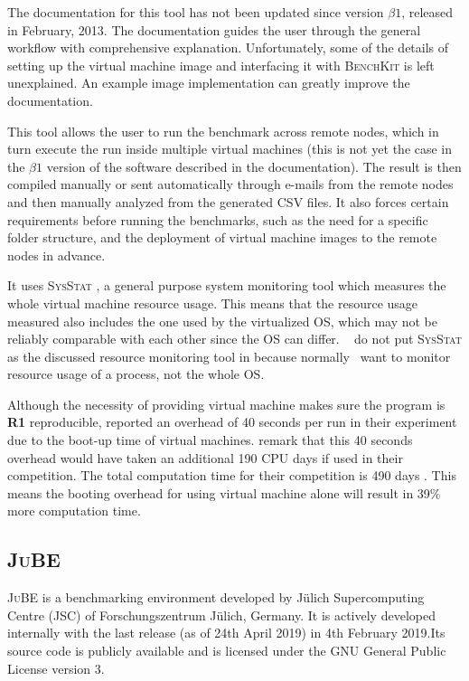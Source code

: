The documentation for this tool has not been updated since version $\beta1$, released in February, 2013.
The documentation guides the user through the general workflow with comprehensive explanation.
Unfortunately, some of the details of setting up the virtual machine image and interfacing it with \textsc{BenchKit} is left unexplained.
An example image implementation can greatly improve the documentation.


This tool allows the user to run the benchmark across remote nodes, which in turn execute the run inside multiple virtual machines (this is not yet the case in the $\beta1$ version of the software described in the documentation).
The result is then compiled manually or sent automatically through e-mails from the remote nodes and then manually analyzed from the generated CSV files.
It also forces certain requirements before running the benchmarks, such as the need for a specific folder structure, and the deployment of virtual machine images to the remote nodes in advance.

It uses \textsc{SysStat} \citep{sebastienPerformanceMonitoringTools2019}, a general purpose system monitoring tool which measures the whole virtual machine resource usage.
This means that the resource usage measured also includes the one used by the virtualized OS, which may not be reliably comparable with each other since the OS can differ.
\First~ do not put \textsc{SysStat} as the discussed resource monitoring tool in  because normally \first~want to monitor resource usage of a process, not the whole OS.


Although the necessity of providing virtual machine makes sure the program is \textbf{R1} reproducible, \citet{kordonBenchKitToolMassive2014} reported an overhead of 40 seconds per run in their experiment due to the boot-up time of virtual machines.
\cite{beyerReliableBenchmarkingRequirements2019} remark that this 40 seconds overhead would have taken an additional 190 CPU days if used in their competition.
The total computation time for their competition is 490 days \citep{beyer2017software}.
This means the booting overhead for using virtual machine alone will result in 39\% more computation time.


\subsection{\textsc{JuBE}}

\textsc{JuBE} \citep{frings2010flexible} is a benchmarking environment developed by Jülich Supercomputing Centre (JSC) of Forschungszentrum Jülich, Germany.
It is actively developed internally with the last release (as of 24th April 2019) in 4th February 2019.Its source code is publicly available and is licensed under the GNU General Public License version 3.

